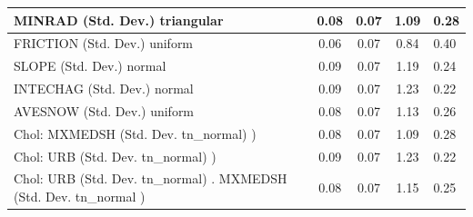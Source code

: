 \begin{table}
\begin{center}
\begin{tabular}{|l|l|c|c|c|l|}
			\hline
			MINRAD (Std. Dev.) triangular &  & 0.08 & 0.07 & 1.09 & 0.28 \\
			\hline
			FRICTION (Std. Dev.) uniform &  & 0.06 & 0.07 & 0.84 & 0.40 \\
			\hline
			SLOPE (Std. Dev.) normal &  & 0.09 & 0.07 & 1.19 & 0.24 \\
			\hline
			INTECHAG (Std. Dev.) normal &  & 0.09 & 0.07 & 1.23 & 0.22 \\
			\hline
			AVESNOW (Std. Dev.) uniform &  & 0.08 & 0.07 & 1.13 & 0.26 \\
			\hline
			 Chol: MXMEDSH (Std. Dev. tn_normal) ) &  & 0.08 & 0.07 & 1.09 & 0.28 \\
			\hline
			 Chol: URB (Std. Dev. tn_normal) ) &  & 0.09 & 0.07 & 1.23 & 0.22 \\
			\hline
			 Chol: URB (Std. Dev. tn_normal) . MXMEDSH (Std. Dev.   tn_normal ) &  & 0.08 & 0.07 & 1.15 & 0.25 \\
			\hline
		\end{tabular}
	\end{center}
\end{table}